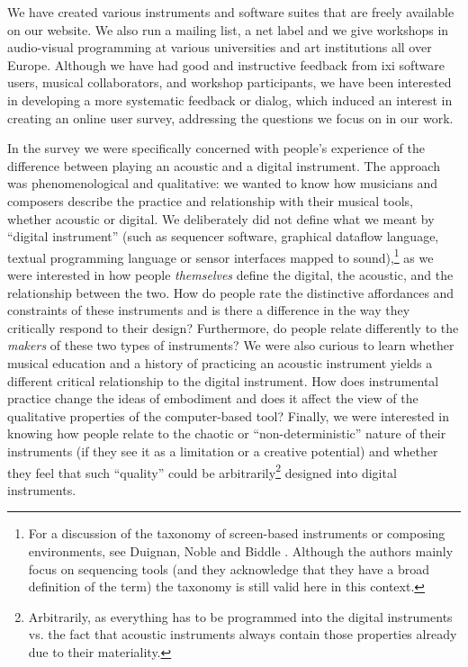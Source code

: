 We have created various instruments and software suites that are freely
available on our website. We also run a mailing list, a net label and we give
workshops in audio-visual programming at various universities and art
institutions all over Europe. Although we have had good and instructive feedback
from ixi software users, musical collaborators, and workshop participants, we
have been interested in developing a more systematic feedback or dialog, which
induced an interest in creating an online user survey, addressing the questions
we focus on in our work.

In the survey we were specifically concerned with people's experience of the
difference between playing an acoustic and a digital instrument. The approach was
phenomenological and qualitative: we wanted to know how musicians and composers
describe the practice and relationship with their musical tools, whether acoustic
or digital. We deliberately did not define what we meant by ``digital
instrument'' (such as sequencer software, graphical dataflow language, textual
programming language or sensor interfaces mapped to sound),\footnote{For a
discussion of the taxonomy of screen-based instruments or composing environments,
see Duignan, Noble and Biddle \cite{Duignan:2005}. Although the authors mainly focus on
sequencing tools (and they acknowledge that they have a broad definition of the
term) the taxonomy is still valid here in this context.} as we were interested
in how people \textit{themselves} define the digital, the acoustic, and the
relationship between the two. How do people rate the distinctive affordances and
constraints of these instruments and is there a difference in the way they
critically respond to their design? Furthermore, do people relate differently to
the \textit{makers} of these two types of instruments? We were also curious to
learn whether musical education and a history of practicing an acoustic
instrument yields a different critical relationship to the digital instrument.
How does instrumental practice change the ideas of embodiment and does it affect
the view of the qualitative properties of the computer-based tool? Finally, we
were interested in knowing how people relate to the chaotic or
``non-deterministic'' nature of their instruments (if they see it as a limitation
or a creative potential) and whether they feel that such ``quality'' could be
arbitrarily\footnote{Arbitrarily, as everything has to be programmed into the
digital instruments vs. the fact that acoustic instruments always contain those
properties already due to their materiality.} designed into digital instruments.


